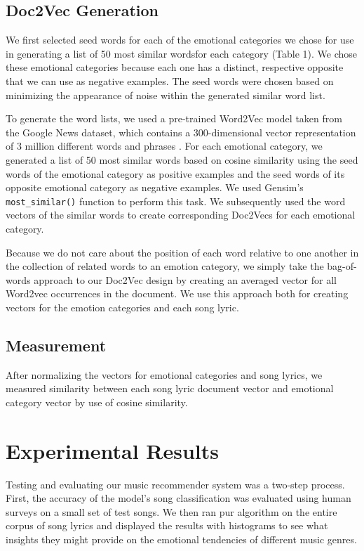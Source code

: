 \documentclass[10pt,twocolumn]{article}
\begin{document}
\subsection{Doc2Vec Generation}

We first selected seed words for each of the emotional categories we chose for use in generating a list of 50 most similar wordsfor each category (Table 1).  We chose these emotional categories because each one has a distinct, respective opposite that we can use as negative examples.  The seed words were chosen based on minimizing the appearance of noise within the generated similar word list.

To generate the word lists, we used a pre-trained Word2Vec model taken from the Google News dataset, which contains a 300-dimensional vector representation of 3 million different words and phrases \cite{a6}.  For each emotional category, we generated a list of 50 most similar words based on cosine similarity using the seed words of the emotional category as positive examples and the seed words of its opposite emotional category as negative examples.  We used Gensim's \texttt{most\_similar()} function to perform this task.  We subsequently used the word vectors of the similar words to create corresponding Doc2Vecs for each emotional category.

Because we do not care about the position of each word relative to one another in the collection of related words to an emotion category, we simply take the bag-of-words approach to our Doc2Vec design by creating an averaged vector for all Word2vec occurrences in the document.  We use this approach both for creating vectors for the emotion categories and each song lyric.

\subsection{Measurement}

After normalizing the vectors for emotional categories and song lyrics, we measured similarity between each song lyric document vector and emotional category vector by use of cosine similarity.

\section{Experimental Results}
Testing and evaluating our music recommender system was a two-step process. First, the accuracy of the model's song classification was evaluated using human surveys on a small set of test songs. We then ran pur algorithm on the entire corpus of song lyrics and displayed the results with histograms to see what insights they might provide on the emotional tendencies of different music genres.
\end{document}
